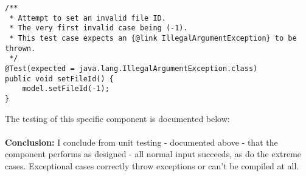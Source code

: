 \documentclass[9pt]{article}
\renewenvironment{framed}[1][\hsize]
   {\MakeFramed{\hsize#1\advance\hsize-\width \FrameRestore}}%
   {\endMakeFramed}
\begin{document}
			\begin{framed}[1.2\textwidth]	
				\begin{verbatim}
/**
 * Attempt to set an invalid file ID.
 * The very first invalid case being (-1).
 * This test case expects an {@link IllegalArgumentException} to be thrown.
 */
@Test(expected = java.lang.IllegalArgumentException.class)
public void setFileId() {
	model.setFileId(-1);
}
			\end{verbatim}
		\end{framed}
		
		The testing of this specific component is documented below:\\

			\noindent{}\\

			\textbf{Conclusion:}
			I conclude from unit testing - documented above - that the component
			performs as designed - all normal input succeeds, as do the extreme
			cases. Exceptional cases correctly throw exceptions or can't be
			compiled at all.\\
\end{document}

